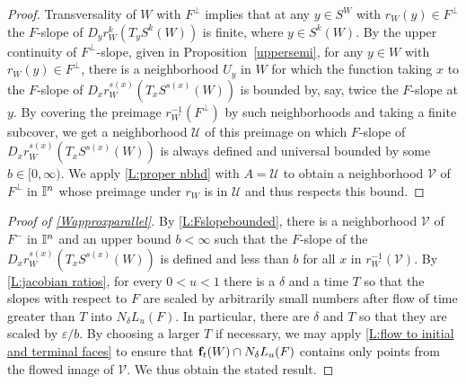 \begin{proof}
	Transversality of $W$ with $F^\perp$ implies that at any $y \in S^W$ with $r_W(y) \in F^\perp$ the $F$-slope of $D_yr^k_W(T_yS^k(W))$ is finite, where $y \in S^k(W)$.
	By the upper continuity of $F^\perp$-slope, given in Proposition~\ref{uppersemi}, for any $y \in W$ with $r_W(y) \in F^\perp$, there is a neighborhood $U_y$ in $W$ for which the function taking $x$ to the $F$-slope of $D_xr^{s(x)}_W(T_xS^{s(x)}(W))$ is bounded by, say, twice the $F$-slope at $y$.
	By covering the preimage $r_W^{-1}(F^\perp)$ by such neighborhoods and taking a finite subcover, we get a neighborhood ${\mathcal U}$ of this preimage on which $F$-slope of $D_xr^{s(x)}_W(T_xS^{s(x)}(W))$ is always defined and universal bounded by some $b \in [0,\infty)$.
	We apply \cref{L:proper nbhd} with $A = {\mathcal U}$ to obtain a neighborhood $\mathcal{V}$ of $F^\perp$ in $\mathbb{I}^n$ whose preimage under $r_W$ is in ${\mathcal U}$ and thus respects this bound.
\end{proof}


\begin{proof}[Proof of \cref{Wapproxparallel}]
	By \cref{L:Fslopebounded}, there is a neighborhood $\mathcal{V}$ of $F^-$ in $\mathbb{I}^n$ and an upper bound $b < \infty$ such that the $F$-slope of the $D_xr^{s(x)}_W(T_xS^{s(x)}(W))$ is defined and less than $b$ for all $x$ in $r_W^{-1}(\mathcal{V})$.
	By \cref{L:jacobian ratios}, for every $0 < u < 1$ there is a $\delta$ and a time $T$ so that the slopes with respect to $F$ are scaled by arbitrarily small numbers after flow of time greater than $T$ into $N_\delta L_u(F)$.
	In particular, there are $\delta$ and $T$ so that they are scaled by $\varepsilon/ b$.
	By choosing a larger $T$ if necessary, we may apply \cref{L:flow to initial and terminal faces} to ensure that $\mathbf{f}_t(W) \cap N_\delta L_u(F)$ contains only points from the flowed image of ${\mathcal{V}}$.
	We thus obtain the stated result.
\end{proof}



